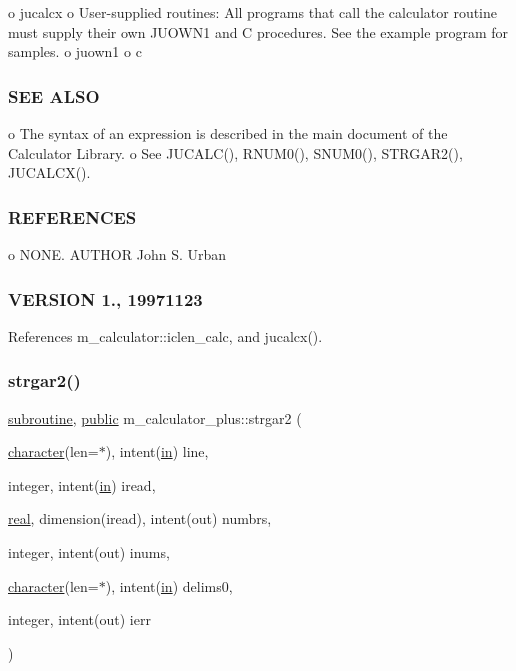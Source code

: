 o jucalcx o User-\/supplied routines\+: All programs that call the calculator routine must supply their own J\+U\+O\+W\+N1 and C procedures. See the example program for samples. o juown1 o c

\subsubsection*{S\+EE A\+L\+SO}

o The syntax of an expression is described in the main document of the Calculator Library. o See J\+U\+C\+A\+L\+C(), R\+N\+U\+M0(), S\+N\+U\+M0(), S\+T\+R\+G\+A\+R2(), J\+U\+C\+A\+L\+C\+X().

\subsubsection*{R\+E\+F\+E\+R\+E\+N\+C\+ES}

o N\+O\+NE. A\+U\+T\+H\+OR John S. Urban \subsubsection*{V\+E\+R\+S\+I\+ON 1., 19971123}

References m\+\_\+calculator\+::iclen\+\_\+calc, and jucalcx().

\mbox{\label{namespacem__calculator__plus_a59710eb6babeed1f4b8d439f97d5d90a}} 
\subsubsection{\texorpdfstring{strgar2()}{strgar2()}}
{\footnotesize\ttfamily \hyperlink{M__stopwatch_83_8txt_acfbcff50169d691ff02d4a123ed70482}{subroutine}, \hyperlink{M__stopwatch_83_8txt_a2f74811300c361e53b430611a7d1769f}{public} m\+\_\+calculator\+\_\+plus\+::strgar2 (\begin{DoxyParamCaption}\item[{\hyperlink{option__stopwatch_83_8txt_abd4b21fbbd175834027b5224bfe97e66}{character}(len=$\ast$), intent(\hyperlink{M__journal_83_8txt_afce72651d1eed785a2132bee863b2f38}{in})}]{line,  }\item[{integer, intent(\hyperlink{M__journal_83_8txt_afce72651d1eed785a2132bee863b2f38}{in})}]{iread,  }\item[{\hyperlink{read__watch_83_8txt_abdb62bde002f38ef75f810d3a905a823}{real}, dimension(iread), intent(out)}]{numbrs,  }\item[{integer, intent(out)}]{inums,  }\item[{\hyperlink{option__stopwatch_83_8txt_abd4b21fbbd175834027b5224bfe97e66}{character}(len=$\ast$), intent(\hyperlink{M__journal_83_8txt_afce72651d1eed785a2132bee863b2f38}{in})}]{delims0,  }\item[{integer, intent(out)}]{ierr }\end{DoxyParamCaption})}



